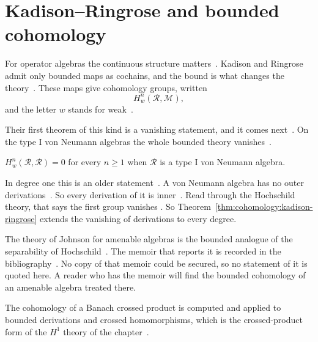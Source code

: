 \section{Kadison--Ringrose and bounded cohomology}\label{sec:cohomology:bounded-cohomology}

For operator algebras the continuous structure
matters~\cite[pp.~227--228]{KadisonRingrose1971}. Kadison and Ringrose admit
only bounded maps as cochains, and the bound is what changes the
theory~\cite[pp.~227--228]{KadisonRingrose1971}. These maps give cohomology
groups, written
\[
  H_w^n(\mathcal{R}, \mathcal{M}),
\]
and the letter $w$ stands for weak~\cite[pp.~227--228]{KadisonRingrose1971}.

Their first theorem of this kind is a vanishing statement, and it comes
next~\cite[Theorem~4.4, p.~239]{KadisonRingrose1971}. On the type I von
Neumann algebras the whole bounded theory vanishes~\cite[Theorem~4.4,
p.~239]{KadisonRingrose1971}.

\begin{theorem}\label{thm:cohomology:kadison-ringrose}
$H_w^n(\mathcal{R}, \mathcal{R}) = 0$ for every $n \ge 1$ when $\mathcal{R}$ is a
type I von Neumann algebra.
\end{theorem}

In degree one this is an older
statement~\cite[pp.~227--228]{KadisonRingrose1971}. A von Neumann algebra has
no outer derivations~\cite[pp.~227--228]{KadisonRingrose1971}. So every
derivation of it is inner~\cite[pp.~227--228]{KadisonRingrose1971}. Read
through the Hochschild theory, that says the first group vanishes
\cite[pp.~227--228]{KadisonRingrose1971}. So
Theorem~\ref{thm:cohomology:kadison-ringrose} extends the vanishing of
derivations to every degree.

The theory of Johnson for amenable algebras is the bounded analogue of the
separability of Hochschild~\cite[pp.~227--228]{KadisonRingrose1971}.
The memoir that reports it is recorded in the bibliography~\cite{Johnson1972}.
No copy of that memoir could be secured, so no statement of it is quoted here.
A reader who has the memoir will find the bounded cohomology of an amenable
algebra treated there.

The cohomology of a Banach crossed product is computed and applied to bounded
derivations and crossed homomorphisms, which is the crossed-product form of
the $H^1$ theory of the chapter~\cite{WlCohomologyOverBanachCrossedPro1979}.
